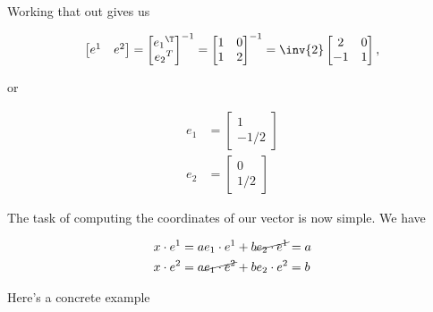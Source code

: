 Working that out gives us

\begin{equation}\label{eqn:grahamSchmidtLorentz:170}
\begin{bmatrix}
e^1 & e^2
\end{bmatrix}
=
{
\begin{bmatrix}
{e_1}^\T \\
{e_2}^T
\end{bmatrix}
}^{-1}
=
{\begin{bmatrix}
1 & 0 \\
1 & 2
\end{bmatrix}}^{-1}
=
\inv{2}
\begin{bmatrix}
2 & 0 \\
-1 & 1
\end{bmatrix},
\end{equation}

or

\begin{equation}\label{eqn:grahamSchmidtLorentz:190}
\begin{aligned}
e_1 &=
\begin{bmatrix}
1 \\
-1/2
\end{bmatrix} \\
e_2 &=
\begin{bmatrix}
0 \\
1/2
\end{bmatrix}
\end{aligned}
\end{equation}

The task of computing the coordinates of our vector is now simple.  We have

\begin{equation}\label{eqn:grahamSchmidtLorentz:340}
\begin{aligned}
x \cdot e^1 &= a e_1 \cdot e^1 + b \cancel{e_2 \cdot e^1} = a \\
x \cdot e^2 &= a \cancel{e_1 \cdot e^2} + b e_2 \cdot e^2 = b
\end{aligned}
\end{equation}

Here's a concrete example

